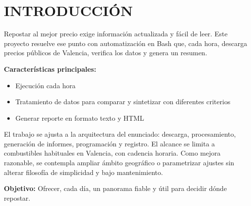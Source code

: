 \chapter{INTRODUCCIÓN}

Repostar al mejor precio exige información actualizada y fácil de leer. Este proyecto resuelve ese punto con automatización en Bash que, cada hora, descarga precios públicos de Valencia, verifica los datos y genera un resumen.

\textbf{Características principales:}
\begin{itemize}[noitemsep]
  \item Ejecución cada hora
  \item Tratamiento de datos para comparar y sintetizar con diferentes criterios
  \item Generar reporte en formato texto y HTML
\end{itemize}

El trabajo se ajusta a la arquitectura del enunciado: descarga, procesamiento, generación de informes, programación y registro. El alcance se limita a combustibles habituales en Valencia, con cadencia horaria. Como mejora razonable, se contempla ampliar ámbito geográfico o parametrizar ajustes sin alterar filosofía de simplicidad y bajo mantenimiento.

\textbf{Objetivo:} Ofrecer, cada día, un panorama fiable y útil para decidir dónde repostar.
